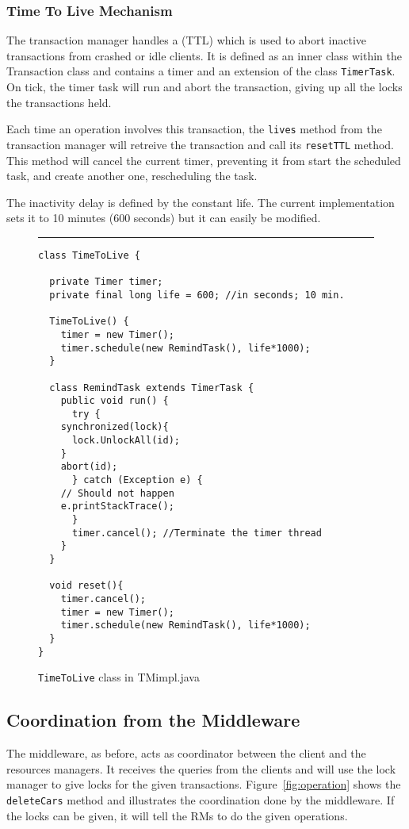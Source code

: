 \documentclass[12pt]{article}
\theoremstyle{plain}%
\theoremstyle{definition}
\theoremstyle{remark}
\newcommand{\java}[1]{{\lstinline!#1!}}
\newenvironment{figureone}[1]{%
  \def\deffigurecaption{#1}%
  \begin{figure}[htbp]%
  \begin{center}%
  \begin{minipage}{\columnwidth}%
  \hrule \vspace*{2ex}%
}{%
  \end{minipage}%
  \end{center}%
  \caption{\deffigurecaption}%
  \end{figure}%
}
\begin{document}
\subsubsection*{Time To Live Mechanism}

The transaction manager handles a (TTL) which is used to abort inactive transactions from crashed or idle clients. It is defined as an inner class within the Transaction class and contains a timer and an extension of the class \java{TimerTask}. On tick, the timer task will run and abort the transaction, giving up all the locks the transactions held. 

Each time an operation involves this transaction, the \java{lives} method from the transaction manager will retreive the transaction and call its \java{resetTTL} method. This method will cancel the current timer, preventing it from start the scheduled task, and create another one, rescheduling the task.

The inactivity delay is defined by the constant life. The current implementation sets it to 10 minutes (600 seconds) but it can easily be modified.

\begin{figureone}{\java{TimeToLive} class in TMimpl.java \label{fig:ttl}}
\begin{lstlisting}
class TimeToLive {

  private Timer timer;
  private final long life = 600; //in seconds; 10 min.
  
  TimeToLive() {
    timer = new Timer();
    timer.schedule(new RemindTask(), life*1000);
  }
  
  class RemindTask extends TimerTask {
    public void run() {
      try {
	synchronized(lock){
	  lock.UnlockAll(id);
	}
	abort(id);
      } catch (Exception e) {
	// Should not happen
	e.printStackTrace();
      }
      timer.cancel(); //Terminate the timer thread
    }
  }	
  
  void reset(){
    timer.cancel();
    timer = new Timer();
    timer.schedule(new RemindTask(), life*1000);
  }
}
\end{lstlisting}
\end{figureone}


\subsection*{Coordination from the Middleware}

The middleware, as before, acts as coordinator between the client and the resources managers. It receives the queries from the clients and will use the lock manager to give locks for the given transactions. Figure~\ref{fig:operation} shows the \java{deleteCars} method and illustrates the coordination done by the middleware. If the locks can be given, it will tell the RMs to do the given operations. 
\end{document}
